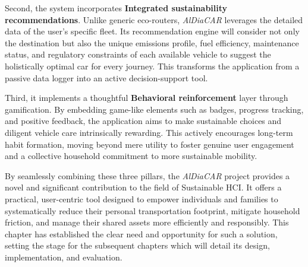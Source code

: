 \textgap

Second, the system incorporates \textbf{Integrated sustainability recommendations}. Unlike generic eco-routers, \textit{AlDiaCAR} leverages the detailed data of the user's specific fleet. Its recommendation engine will consider not only the destination but also the unique emissions profile, fuel efficiency, maintenance status, and regulatory constraints of each available vehicle to suggest the holistically optimal car for every journey. This transforms the application from a passive data logger into an active decision-support tool.

\textgap

Third, it implements a thoughtful \textbf{Behavioral reinforcement} layer through gamification. By embedding game-like elements such as badges, progress tracking, and positive feedback, the application aims to make sustainable choices and diligent vehicle care intrinsically rewarding. This actively encourages long-term habit formation, moving beyond mere utility to foster genuine user engagement and a collective household commitment to more sustainable mobility.

\textgap

By seamlessly combining these three pillars, the \textit{AlDiaCAR} project provides a novel and significant contribution to the field of Sustainable HCI. It offers a practical, user-centric tool designed to empower individuals and families to systematically reduce their personal transportation footprint, mitigate household friction, and manage their shared assets more efficiently and responsibly. This chapter has established the clear need and opportunity for such a solution, setting the stage for the subsequent chapters which will detail its design, implementation, and evaluation.
